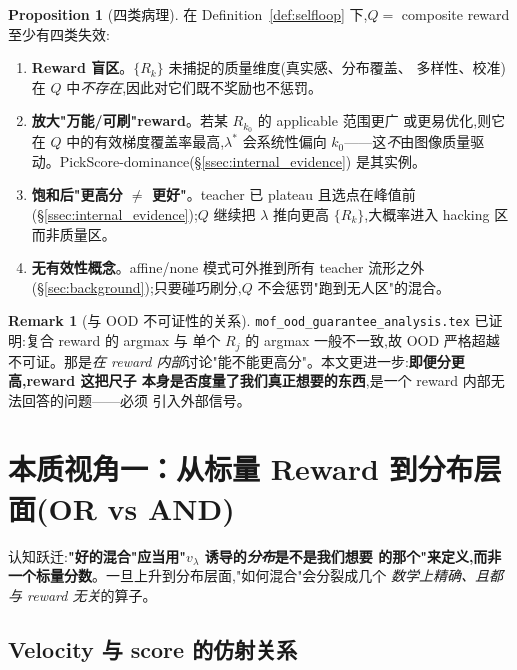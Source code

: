 \documentclass[11pt,a4paper]{article}
\theoremstyle{definition}
\newtheorem{remark}{Remark}
\newtheorem{proposition}{Proposition}
\begin{document}
\begin{proposition}[四类病理]
\label{prop:pathology}
在 Definition~\ref{def:selfloop} 下,$Q=$ composite reward 至少有四类失效:
\begin{enumerate}[leftmargin=1.5em]
\item \textbf{Reward 盲区}。$\{R_k\}$ 未捕捉的质量维度(真实感、分布覆盖、
多样性、校准)在 $Q$ 中\emph{不存在},因此对它们既不奖励也不惩罚。
\item \textbf{放大"万能/可刷"reward}。若某 $R_{k_0}$ 的 applicable 范围更广
或更易优化,则它在 $Q$ 中的有效梯度覆盖率最高,$\lambda^*$ 会系统性偏向
$k_0$——这\emph{不}由图像质量驱动。PickScore-dominance(\S\ref{ssec:internal_evidence})
是其实例。
\item \textbf{饱和后"更高分 $\neq$ 更好"}。teacher 已 plateau 且选点在峰值前
(\S\ref{ssec:internal_evidence});$Q$ 继续把 $\lambda$ 推向更高
$\{R_k\}$,大概率进入 hacking 区而非质量区。
\item \textbf{无有效性概念}。affine/none 模式可外推到所有 teacher 流形之外
(\S\ref{sec:background});只要碰巧刷分,$Q$ 不会惩罚"跑到无人区"的混合。
\end{enumerate}
\end{proposition}

\begin{remark}[与 OOD 不可证性的关系]
\texttt{mof\_ood\_guarantee\_analysis.tex} 已证明:复合 reward 的 argmax 与
单个 $R_j$ 的 argmax 一般不一致,故 OOD 严格超越不可证。那是\emph{在 reward
内部}讨论"能不能更高分"。本文更进一步:\textbf{即便分更高,reward 这把尺子
本身是否度量了我们真正想要的东西},是一个 reward 内部无法回答的问题——必须
引入外部信号。
\end{remark}

\section{本质视角一：从标量 Reward 到分布层面(OR vs AND)}
\label{sec:or_and}

认知跃迁:\textbf{"好的混合"应当用"$v_\lambda$ 诱导的\emph{分布}是不是我们想要
的那个"来定义,而非一个标量分数}。一旦上升到分布层面,"如何混合"会分裂成几个
\emph{数学上精确、且都与 reward 无关}的算子。

\subsection{Velocity 与 score 的仿射关系}
\label{ssec:v_s_affine}
\end{document}
